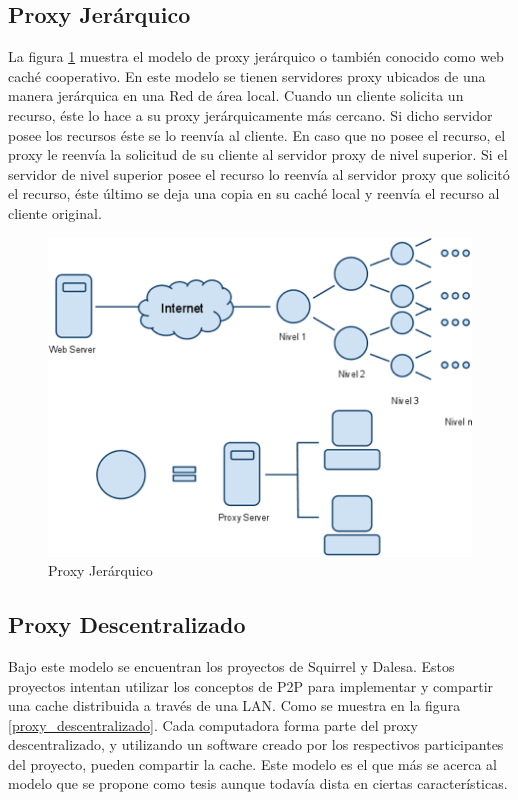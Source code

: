 
\subsection{Proxy Jerárquico}

La figura \ref{proxy_jerarquico} muestra el modelo de proxy jerárquico o también conocido como web caché cooperativo. En este modelo se tienen servidores proxy ubicados de una manera jerárquica en una Red de área local. Cuando un cliente solicita un recurso, éste lo hace a su proxy jerárquicamente más cercano. Si dicho servidor posee los recursos éste se lo reenvía al cliente. En caso que no posee el recurso, el proxy le reenvía la solicitud de su cliente al servidor proxy de nivel superior. Si el servidor de nivel superior posee el recurso lo reenvía al servidor proxy que solicitó el recurso, éste último se deja una copia en su caché local y reenvía el recurso al cliente original.

\begin{figure}[h]
  \centering
    \includegraphics[scale=1]{gfx/proxy_jerarquico}
  \caption{Proxy Jerárquico}
  \label{proxy_jerarquico}
\end{figure}


\subsection{Proxy Descentralizado}

Bajo este modelo se encuentran los proyectos de Squirrel y Dalesa. Estos proyectos intentan utilizar los conceptos de P2P para implementar y compartir una cache distribuida a través de una LAN. Como se muestra en la figura \ref{proxy_descentralizado}. Cada computadora forma parte del proxy descentralizado, y utilizando un software creado por los respectivos participantes del proyecto, pueden compartir la cache. Este modelo es el que más se acerca al modelo que se propone como tesis aunque todavía dista en ciertas características.

